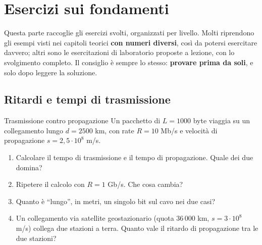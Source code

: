\chapter{Esercizi sui fondamenti}

Questa parte raccoglie gli esercizi svolti, organizzati per livello. Molti riprendono gli esempi visti nei capitoli teorici
\textbf{con numeri diversi}, così da potersi esercitare davvero; altri sono le esercitazioni di laboratorio proposte a lezione,
con lo svolgimento completo. Il consiglio è sempre lo stesso: \textbf{provare prima da soli}, e solo dopo leggere la soluzione.

\section{Ritardi e tempi di trasmissione}


\begin{esercizio}{Trasmissione contro propagazione}
Un pacchetto di $L = 1000$ byte viaggia su un collegamento lungo $d = 2500$ km, con rate $R = 10$ Mb/s e velocità di
propagazione $s = 2{,}5 \cdot 10^8$ m/s.
\begin{enumerate}[label=(\alph*)]
    \item Calcolare il tempo di trasmissione e il tempo di propagazione. Quale dei due domina?
    \item Ripetere il calcolo con $R = 1$ Gb/s. Che cosa cambia?
    \item Quanto è ``lungo'', in metri, un singolo bit sul cavo nei due casi?
    \item Un collegamento via satellite geostazionario (quota $36\,000$ km, $s = 3\cdot 10^8$ m/s) collega due stazioni a
          terra. Quanto vale il ritardo di propagazione tra le due stazioni?
\end{enumerate}
\end{esercizio}

